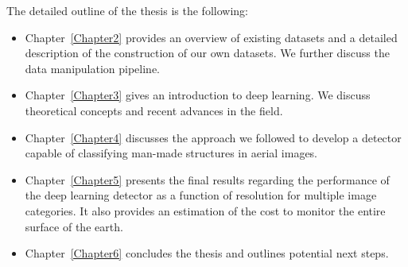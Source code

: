 The detailed outline of the thesis is the following:
\begin{itemize}
	\item Chapter~\ref{Chapter2} provides an overview of existing datasets and a detailed description of the construction of our own datasets. We further discuss the data manipulation pipeline.
	
	\item Chapter~\ref{Chapter3} gives an introduction to deep learning. We discuss theoretical concepts and recent advances in the field.
	
	\item Chapter~\ref{Chapter4} discusses the approach we followed to develop a detector capable of classifying man-made structures in aerial images.
	
	\item Chapter~\ref{Chapter5} presents the final results regarding the performance of the deep learning detector as a function of resolution for multiple image categories. It also provides an estimation of the cost to monitor the entire surface of the earth.
	
	\item Chapter~\ref{Chapter6} concludes the thesis and outlines potential next steps.	
\end{itemize}	
